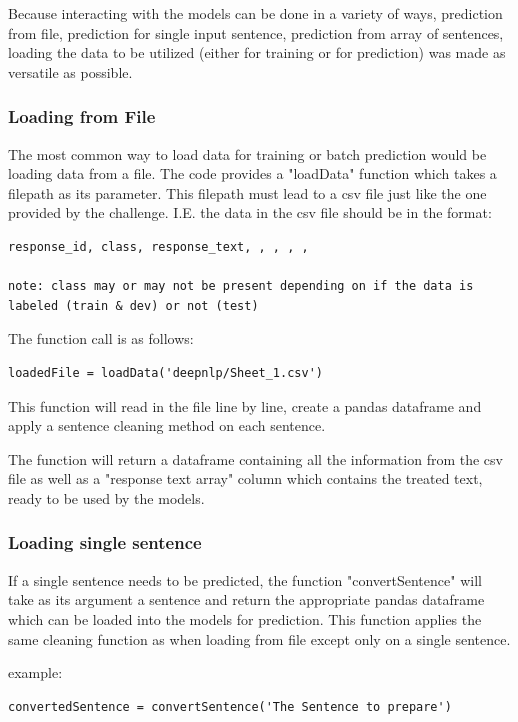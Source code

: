 \documentclass[twoside,twocolumn]{article}
\begin{document}
Because interacting with the models can be done in a variety of ways, prediction from file, prediction for single input sentence,
prediction from array of sentences, loading the data to be utilized (either for training or for prediction) was made as versatile as possible.

\subsubsection{Loading from File}

The most common way to load data for training or batch prediction would be loading data from a file. The code provides a "loadData" function
which takes a filepath as its parameter. This filepath must lead to a csv file just like the one provided by the challenge. I.E. the data in 
the csv file should be in the format:
\begin{lstlisting}
response_id, class, response_text, , , , , 

note: class may or may not be present depending on if the data is labeled (train & dev) or not (test)
\end{lstlisting}

The function call is as follows:
\begin{lstlisting}
loadedFile = loadData('deepnlp/Sheet_1.csv')
\end{lstlisting}

This function will read in the file line by line, create a pandas dataframe and apply a sentence cleaning method on each sentence.

The function will return a dataframe containing all the information from the csv file as well as a "response text array" column which contains the
treated text, ready to be used by the models.

\subsubsection{Loading single sentence}

If a single sentence needs to be predicted, the function "convertSentence" will take as its argument a sentence and return the appropriate pandas dataframe
which can be loaded into the models for prediction. This function applies the same cleaning function as when loading from file except only on a single sentence.

example:
\begin{lstlisting}
convertedSentence = convertSentence('The Sentence to prepare')
\end{lstlisting}
\end{document}
